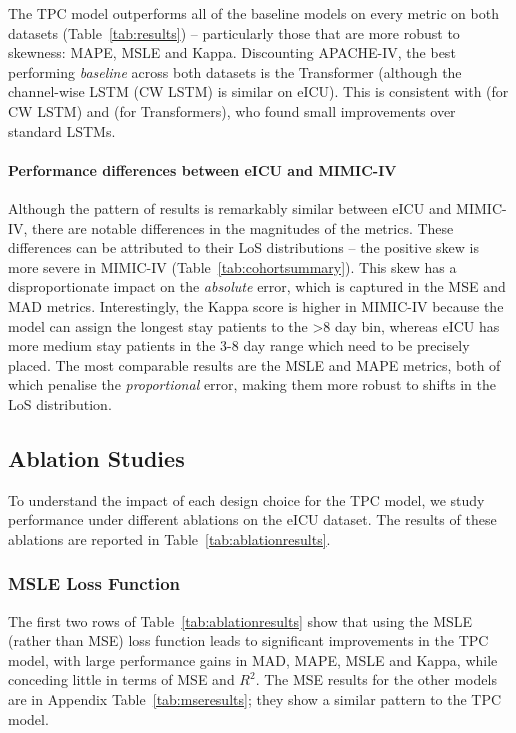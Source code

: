 \documentclass[sigconf]{acmart}
\begin{document}
\label{tpcperf}
The TPC model outperforms all of the baseline models on every metric on both datasets (Table~\ref{tab:results}) -- particularly those that are more robust to skewness: MAPE, MSLE and Kappa. Discounting APACHE-IV, the best performing \textit{baseline} across both datasets is the Transformer (although the channel-wise LSTM (CW LSTM) is similar on eICU). This is consistent with \citet{harutyunyan} (for CW LSTM) and \citet{2304ed73e858419398e3ee1508af5825} (for Transformers), who found small improvements over standard LSTMs. 

\paragraph{Performance differences between eICU and MIMIC-IV} Although the pattern of results is remarkably similar between eICU and MIMIC-IV, there are notable differences in the magnitudes of the metrics. These differences can be attributed to their LoS distributions -- the positive skew is more severe in MIMIC-IV (Table~\ref{tab:cohortsummary}). This skew has a disproportionate impact on the \emph{absolute} error, which is captured in the MSE and MAD metrics. Interestingly, the Kappa score is higher in MIMIC-IV because the model can assign the longest stay patients to the >8 day bin, whereas eICU has more medium stay patients in the 3-8 day range which need to be precisely placed. The most comparable results are the MSLE and MAPE metrics, both of which penalise the \emph{proportional} error, making them more robust to shifts in the LoS distribution. 

\subsection{Ablation Studies}
To understand the impact of each design choice for the TPC model, we study performance under different ablations on the eICU dataset. The results of these ablations are reported in Table~\ref{tab:ablationresults}.

\subsubsection{MSLE Loss Function}
The first two rows of Table~\ref{tab:ablationresults} show that using the MSLE (rather than MSE) loss function leads to significant improvements in the TPC model, with large performance gains in MAD, MAPE, MSLE and Kappa, while conceding little in terms of MSE and $R^2$. The MSE results for the other models are in Appendix Table~\ref{tab:mseresults}; they show a similar pattern to the TPC model.
\end{document}
